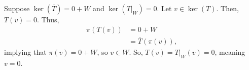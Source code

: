 \documentclass[12pt]{mypackage}
\begin{document}
\begin{solution}
  Suppose $\ker\left(\overline{T}\right) = 0 + W$ and $\ker\left(T\bigr\vert_{W}\right) = 0$. Let $v\in \ker(T)$. Then, $T(v) = 0$. Thus,
  \begin{align*}
    \pi\left(T(v)\right) &= 0 + W\\
                         &= \overline{T}\left(\pi(v)\right),
  \end{align*}
  implying that $\pi(v) = 0 + W$, so $v\in W$. So, $T(v) = T\bigr\vert_{W}\left(v\right) = 0$, meaning $v = 0$.
\end{solution}
\end{document}
